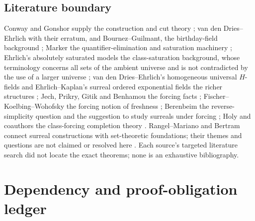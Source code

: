\documentclass[11pt,letterpaper]{article}
\numberwithin{equation}{section}
\theoremstyle{definition}
\theoremstyle{remark}
\begin{document}
\subsection{Literature boundary}

Conway and Gonshor supply the construction and cut theory
\cite{Conway,Gonshor}; van den Dries--Ehrlich with their erratum, and
Bournez--Guilmant, the birthday-field background \cite{vdDE,vdDEerr,BournezGuilmant};
Marker the quantifier-elimination and saturation machinery \cite{Marker};
Ehrlich's absolutely saturated models the class-saturation background, whose
terminology concerns all sets of the ambient universe and is not contradicted by
the use of a larger universe \cite{Ehrlich1989}; van den Dries--Ehrlich's
homogeneous universal $H$-fields and Ehrlich--Kaplan's surreal ordered
exponential fields the richer structures \cite{vdDE2018,EhrlichKaplan}; Jech,
Prikry, Gitik and Benhamou the forcing facts \cite{Jech,Prikry,Gitik,Benhamou};
Fischer--Koelbing--Wohofsky the forcing notion of freshness \cite{FKW};
Berenbeim the reverse-simplicity question and the suggestion to study surreals
under forcing \cite{Berenbeim}; Holy and coauthors the class-forcing completion
theory \cite{HolyEtAl}. Rangel--Mariano and Bertram connect surreal
constructions with set-theoretic foundations; their themes and questions are not
claimed or resolved here \cite{RM,Bertram}. Each source's targeted literature
search did not locate the exact theorems; none is an exhaustive bibliography.

\section{Dependency and proof-obligation ledger}\label{univ:app:ledger}
\end{document}

